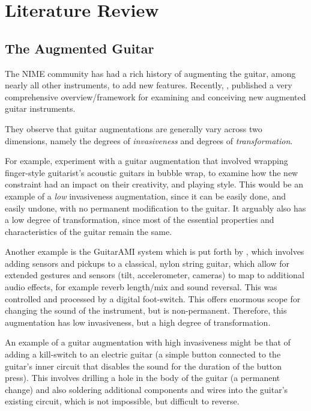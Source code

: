 \section{Literature Review}

\subsection{The Augmented Guitar}
The NIME community has had a rich history of augmenting the guitar, among nearly all other instruments, to add new features. Recently, \cite{avila_augmenting_2019}, published a very comprehensive overview/framework for examining and conceiving new augmented guitar instruments. 

They observe that guitar augmentations are generally
vary across two dimensions, namely the degrees of \textit{invasiveness} and degrees of \textit{transformation}.

For example, \cite{martelloni_percussive_2020} experiment with a guitar augmentation that involved wrapping finger-style guitarist's acoustic guitars in bubble wrap, to examine how the new constraint had an impact on their creativity, and playing style. This would be an example of a \textit{low} invasiveness augmentation, since it can be easily done, and easily undone, with no permanent modification to the guitar. It arguably also has a low degree of transformation, since most of the essential properties and characteristics of the guitar remain the same. 

Another example is the GuitarAMI system which is put forth by \cite{meneses_guitarami_2018}, which involves adding sensors and pickups to a classical, nylon string guitar, which allow for extended gestures and sensors (tilt, accelerometer, cameras) to map to additional audio effects, for example reverb length/mix and sound reversal. This was controlled and processed by a digital foot-switch. This offers enormous scope for changing the sound of the instrument, but is non-permanent. Therefore, this augmentation has low invasiveness, but a high degree of transformation. 

An example of a guitar augmentation with high invasiveness might be that of adding a kill-switch to an electric guitar (a simple button connected to the guitar's inner circuit that disables the sound for the duration of the button press). This involves drilling a hole in the body of the guitar (a permanent change) and also soldering additional components and wires into the guitar's existing circuit, which is not impossible, but difficult to reverse. 

